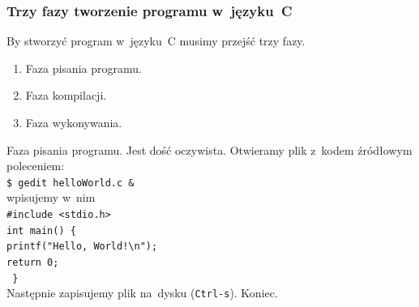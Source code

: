 \documentclass[10pt,t]{beamer}
\begin{document}
\begin{frame}
  \frametitle{Trzy fazy tworzenie programu w~języku~C}


  By stworzyć program w~języku~C musimy przejść trzy fazy.

  \begin{enumerate}

  \item Faza pisania programu.

  \item Faza kompilacji.

  \item Faza wykonywania.

  \end{enumerate}



  \alert{Faza pisania programu.} Jest dość oczywista. Otwieramy plik
  z~kodem źródłowym poleceniem: \\
  \texttt{\$ gedit helloWorld.c \&} \\
  wpisujemy w~nim \\
  \texttt{\#include <stdio.h>} \\
  \texttt{int main() \{ } \\
  \hphantom{aaaa} \texttt{printf("Hello, World!\textbackslash n");} \\
  \hphantom{aaaa} \texttt{return 0;} \\
  \texttt{ \} } \\
  Następnie zapisujemy plik na~dysku (\texttt{Ctrl-s}). Koniec.

















\end{frame}
\end{document}
